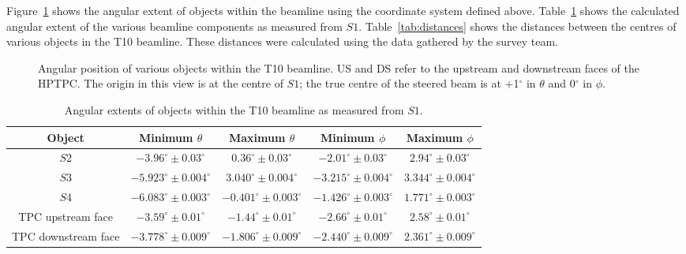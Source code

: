 Figure~\ref{fig:angularDistS1} shows the angular extent of objects within the beamline using the coordinate system defined above.
Table~\ref{tab:angS1} shows the calculated angular extent of the various beamline components as measured from $\mathit{S1}$.
Table~\ref{tab:distances} shows the distances between the centres of various objects in the T10 beamline.
These distances were calculated using the data gathered by the survey team.

\begin{figure}[ht]
  \begin{adjustbox}{max totalsize={0.7\textwidth}{.5\textheight},center}
    
  \end{adjustbox}
  \caption{Angular position of various objects within the T10 beamline. US and DS refer to the upstream and downstream faces of the HPTPC. The origin in this view is at the centre of $\mathit{S1}$; the true centre of the steered beam is at +1$^{\circ}$ in $\theta$ and 0$^{\circ}$ in $\phi$.}
  \label{fig:angularDistS1}
\end{figure}

\begin{table}
  \centering
  \caption{Angular extents of objects within the T10 beamline as measured from $\mathit{S1}$.}
  \begin{tabular}{c|c c c c}
    \hline
    \hline
    Object & Minimum $\theta$ & Maximum $\theta$ & Minimum $\phi$ & Maximum $\phi$ \\
    \hline
    $\mathit{S2}$ & $-3.96^{\circ} \pm 0.03^{\circ}$ & $0.36^{\circ} \pm 0.03^{\circ}$ & $-2.01^{\circ} \pm 0.03^{\circ}$ & $2.94^{\circ} \pm 0.03^{\circ}$ \\
    $\mathit{S3}$ & $-5.923^{\circ} \pm 0.004^{\circ}$ & \hspace{6pt} $3.040^{\circ} \pm 0.004^{\circ}$ & $-3.215^{\circ} \pm 0.004^{\circ}$ & $3.344^{\circ} \pm 0.004^{\circ}$ \\
   $\mathit{S4}$ & $-6.083^{\circ} \pm 0.003^{\circ}$ & $-0.401^{\circ} \pm 0.003^{\circ}$ & $-1.426^{\circ} \pm 0.003^{\circ}$ & $1.771^{\circ} \pm 0.003^{\circ}$ \\
    TPC upstream face & $-3.59^{\circ} \pm 0.01^{\circ}$ & $-1.44^{\circ} \pm 0.01^{\circ}$ & $-2.66^{\circ} \pm 0.01^{\circ}$ & $2.58^{\circ} \pm 0.01^{\circ}$ \\
    TPC downstream face & $-3.778^{\circ} \pm 0.009^{\circ}$ & $-1.806^{\circ} \pm 0.009^{\circ}$ & $-2.440^{\circ} \pm 0.009^{\circ}$ & $2.361^{\circ} \pm 0.009^{\circ}$ \\
    \hline
  \end{tabular}
  \label{tab:angS1}
\end{table}

